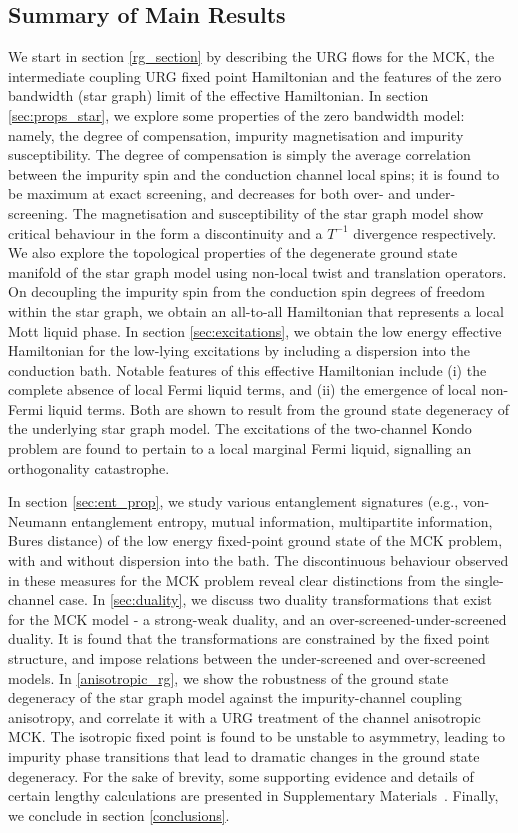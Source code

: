 \documentclass[reprint,prb,superscriptaddress]{revtex4-2}
\begin{document}
\subsection*{Summary of Main Results}
We start in section \ref{rg_section} by describing the URG flows for the MCK, the intermediate coupling URG fixed point Hamiltonian and the features of the zero bandwidth (star graph) limit of the effective Hamiltonian.
In section \ref{sec:props_star}, we explore some properties of the zero bandwidth model: namely, the degree of compensation, impurity magnetisation and impurity susceptibility.
The degree of compensation is simply the average correlation between the impurity spin and the conduction channel local spins; it is found to be maximum at exact screening, and decreases for both over- and under-screening.
The magnetisation and susceptibility of the star graph model show {\color{red}critical behaviour in the form} a discontinuity and a \(T^{-1}\) divergence respectively.
We also explore the topological properties of the degenerate ground state manifold of the star graph model using non-local twist and translation operators.
On decoupling the impurity spin from the conduction spin degrees of freedom within the star graph, we obtain an all-to-all Hamiltonian that represents a local Mott liquid phase.
In section \ref{sec:excitations}, we obtain the low energy effective Hamiltonian for the low-lying excitations by including a dispersion into the conduction bath.
Notable features of this effective Hamiltonian include (i) the complete absence of local Fermi liquid terms, and (ii) the emergence of local non-Fermi liquid terms.
Both are shown to result from the ground state degeneracy of the underlying star graph model.
The excitations of the two-channel Kondo problem are found to pertain to a local marginal Fermi liquid, signalling an orthogonality catastrophe. 

In section \ref{sec:ent_prop}, we study various entanglement signatures (e.g., von-Neumann entanglement entropy, mutual information, multipartite information, Bures distance) of the low energy fixed-point ground state of the MCK problem, with and without dispersion into the bath. The discontinuous behaviour observed in these measures for the MCK problem reveal clear distinctions from the single-channel case. In \ref{sec:duality}, we discuss two duality transformations that exist for the MCK model - a strong-weak duality, and an over-screened-under-screened duality. It is found that the transformations are constrained by the fixed point structure, and impose relations between the under-screened and over-screened models.
In \ref{anisotropic_rg}, we show the robustness of the ground state degeneracy of the star graph model against the impurity-channel coupling anisotropy, and correlate it with a URG treatment of the channel anisotropic MCK.
The isotropic fixed point is found to be unstable to asymmetry, leading to impurity phase transitions that lead to dramatic changes in the ground state degeneracy.
For the sake of brevity, some supporting evidence and details of certain lengthy calculations are presented in Supplementary Materials~\cite{SM}. Finally, we conclude in section \ref{conclusions}.
\end{document}
